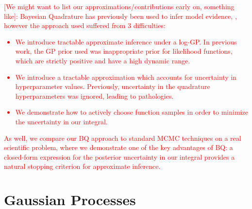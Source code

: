 \documentclass{article}
\begin{document}
\textcolor{red}{[We might want to list our approximations/contributions early on, something like]: Bayesian Quadrature has previously been used to infer model evidence, \citep{BZMonteCarlo}, however the approach used suffered from 3 difficulties: 
\begin{itemize}
\item We introduce tractable approximate inference under a log-GP.  In previous work, the GP prior used was inappropriate prior for likelihood functions, which are strictly positive and have a high dynamic range.
\item We introduce a tractable approximation which accounts for uncertainty in hyperparameter values.  Previously, uncertainty in the quadrature hyperparameters was ignored, leading to pathologies.  
\item We demonstrate how to actively choose function samples in order to minimize the uncertainty in our integral.
\end{itemize}
}
\textcolor{red}{
As well, we compare our BQ approach to standard MCMC techniques on a real scientific problem, where we demonstrate one of the key advantages of BQ: a closed-form expression for the posterior uncertainty in our integral provides a natural stopping criterion for approximate inference.}

\section{Gaussian Processes}
\end{document}
